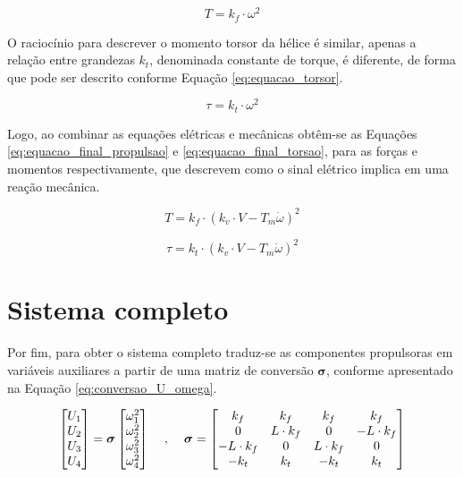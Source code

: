 \documentclass[main.tex]{subfiles}
\begin{document}
\begin{equation}\label{eq:equacao_propulsao}
	T = k_f \cdot \omega^2
\end{equation}

O raciocínio para descrever o momento torsor da hélice é similar, apenas a relação entre grandezas $k_t$, denominada constante de torque, é diferente, de forma que pode ser descrito conforme Equação \ref{eq:equacao_torsor}.

\begin{equation}\label{eq:equacao_torsor}
	\tau = k_t \cdot \omega^2
\end{equation}

Logo, ao combinar as equações elétricas e mecânicas obtêm-se as Equações \ref{eq:equacao_final_propulsao} e \ref{eq:equacao_final_torsao}, para as forças e momentos respectivamente, que descrevem como o sinal elétrico implica em uma reação mecânica.

\begin{equation}\label{eq:equacao_final_propulsao}
	T = k_f \cdot (k_v \cdot V - T_m\dot{\omega})^2
\end{equation}

\begin{equation}\label{eq:equacao_final_torsao}
	\tau = k_t \cdot (k_v \cdot V - T_m\dot{\omega})^2
\end{equation}

\section{Sistema completo}

Por fim, para obter o sistema completo traduz-se as componentes propulsoras em variáveis auxiliares a partir de uma matriz de conversão $\boldsymbol{\sigma}$, conforme apresentado na Equação \ref{eq:conversao_U_omega}.

\begin{equation}\label{eq:conversao_U_omega}
	\begin{bmatrix}
		U_1\\
		U_2\\
		U_3\\
		U_4
	\end{bmatrix} = 
	\boldsymbol{\sigma}
	\begin{bmatrix}
		\omega_1^2\\
		\omega_2^2\\
		\omega_3^2\\
		\omega_4^2
		\end{bmatrix}\hspace{0.4cm},\hspace{0.4cm}\boldsymbol{\sigma} = \begin{bmatrix}
		k_f		& k_f 	& k_f 	& k_f\\
		0 		& L\cdot k_f 	& 0 	& -L\cdot k_f\\
		-L\cdot k_f	& 0		& L\cdot k_f	& 0\\
		-k_t 	& k_t 	& -k_t 	& k_t\\
	\end{bmatrix}
\end{equation}
\end{document}

